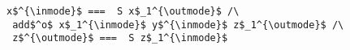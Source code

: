 \begin{figure}[!t]
  \centering
  \begin{minipage}{0.57\columnwidth}
    \begin{lstlisting}[frame=tb]
 x$^{\inmode}$ ===  S x$_1^{\outmode}$ /\
 add$^o$ x$_1^{\inmode}$ y$^{\inmode}$ z$_1^{\outmode}$ /\
 z$^{\outmode}$ ===  S z$_1^{\inmode}$
    \end{lstlisting}
  \end{minipage}
\end{figure}